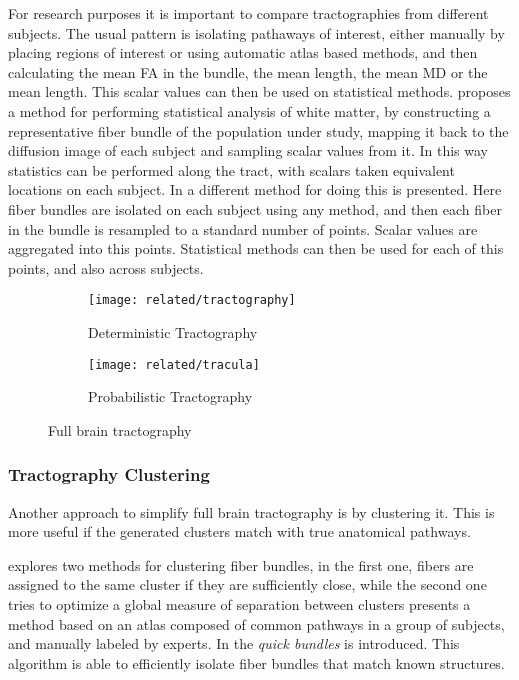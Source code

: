 For research purposes it is important to compare tractographies from different subjects. The usual pattern is isolating pathaways of interest, either manually by placing regions of interest or using automatic atlas based methods, and then calculating the mean FA in the bundle, the mean length, the mean MD or the mean length. This scalar values can then be used on statistical methods.
\autocite{goodlett_group_2008} proposes a method for performing statistical analysis of white matter, by constructing a representative fiber bundle of the population under study, mapping it back to the diffusion image of each subject and sampling scalar values from it. In this way statistics can be performed along the tract, with scalars taken equivalent locations on each subject. In \autocite{colby_along-tract_2011} a different method for doing this is presented. Here fiber bundles are isolated on each subject using any method, and then each fiber in the bundle is resampled to a standard number of points. Scalar values are aggregated into this points. Statistical methods can then be used for each of this points, and also across subjects.

\begin{figure}
    \centering
    \begin{subfigure}{0.48\textwidth}
        \texttt{[image: related/tractography]}
				\caption{Deterministic Tractography}
    \end{subfigure} \hfill
		\begin{subfigure}{0.48\textwidth}
        \texttt{[image: related/tracula]}
				\caption{Probabilistic Tractography}
    \end{subfigure} 
    \caption{Full brain tractography}\label{fig_tracto_det_prob}
\end{figure}

\subsubsection{Tractography Clustering}

Another approach to simplify full brain tractography is by clustering it. This is more useful if the generated clusters match with true anatomical pathways.

\autocite{song_zhang_identifying_2008} explores two methods for clustering fiber bundles, in the first one, fibers are assigned to the same cluster if they are sufficiently close, while the second one tries to optimize a global measure of separation between clusters
\autocite{guevara_automatic_2012} presents a method based on an atlas composed of common pathways in a group of subjects, and manually labeled by experts. 
In \autocite{garyfallidis_dipy_2014} the \emph{quick bundles} is introduced. This algorithm is able to efficiently isolate fiber bundles that match known structures.

